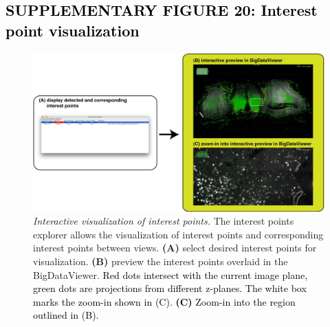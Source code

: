 \documentclass[]{spie}  %
\def\red{\textcolor{black}}
\begin{document}
\subsection*{\red{SUPPLEMENTARY FIGURE 20: Interest point visualization}}
\vspace{1mm}
\begin{figure}[h!]
\includegraphics[width=\textwidth]{Supp-IntrestPoints.jpg}
\vspace{-2.0mm}
\caption{\hspace{-0.5mm} \emph{Interactive visualization of interest points.} The interest points explorer allows the visualization of interest points and corresponding interest points between views. \textbf{(A)} select desired interest points for visualization. \textbf{(B)} preview the interest points overlaid in the BigDataViewer. \red{Red dots intersect with the current image plane, green dots are projections from different z-planes. The white box marks the zoom-in shown in (C). \textbf{(C)} Zoom-in into the region outlined in (B).}
}
\label{fig:sup-fig-interest-point}
\end{figure}

\pagebreak
\end{document}
